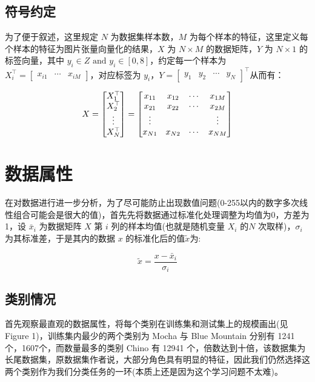 \documentclass[fleqn]{Paquetes/RevDigMatEduInt}
\begin{document}
\subsection{符号约定}

为了便于叙述，这里规定 $N$ 为数据集样本数，$M$ 为每个样本的特征，这里定义每个样本的特征为图片张量向量化的结果，$X$ 为 $N \times M$ 的数据矩阵，$Y$ 为 $N \times 1$ 的标签向量，其中 $y_i \in Z \mbox{ and } y_i \in [0,8]$，约定每一个样本为 $X_i^\top = \begin{bmatrix}x_{i1} & \cdots & x_{iM}\end{bmatrix}$，对应标签为 $y_i$，$Y = \begin{bmatrix}y_1&y_2& \cdots & y_N \end{bmatrix}^\top$从而有：

\begin{align}
	X = \begin{bmatrix}
		X_1^\top \\ X_2^\top \\\vdots \\ X_N^\top 
	\end{bmatrix} = \begin{bmatrix}
	x_{11} & x_{12} & \cdots & x_{1M}\\
	x_{21} & x_{22} & \cdots & x_{2M} \\
	\vdots & & &\vdots\\
	x_{N1} & x_{N2} & \cdots & x_{NM}\notag
	\end{bmatrix} 
\end{align}


\section{数据属性}

在对数据进行进一步分析，为了尽可能防止出现数值问题(0-255以内的数字多次线性组合可能会是很大的值)，首先先将数据通过标准化处理调整为均值为0，方差为1，设 $\bar{x}_i$ 为数据矩阵 $X$ 第 $i$ 列的样本均值(也就是随机变量 $X_i$ 的$N$ 次取样)，$\sigma_i$ 为其标准差，于是其内的数据 $x$ 的标准化后的值$\tilde{x}$为:

$$
\tilde{x} = \frac{x - \bar{x}_i}{\sigma_i}
$$

\subsection{类别情况}

首先观察最直观的数据属性，将每个类别在训练集和测试集上的规模画出(见 Figure 1)，训练集内最少的两个类别为 Mocha 与 Blue Mountain 分别有 1241个，1607个，而数量最多的类别 Chino 有 12941 个，倍数达到十倍，该数据集为长尾数据集，原数据集作者说，大部分角色具有明显的特征，因此我们仍然选择这两个类别作为我们分类任务的一环(本质上还是因为这个学习问题不太难)。
\end{document}
